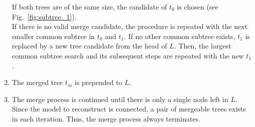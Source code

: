 \begin{enumerate}
	If both trees are of the same size, the candidate of $t_0$ is chosen (see Fig.~\ref{fig:subtree_1}).
	\\
	If there is no valid merge candidate, the procedure is repeated with the next smaller common subtree in $t_0$ and $t_1$.
	If no other common subtree exists, $t_1$ is replaced by a new tree candidate from the head of $L$.
	Then, the largest common subtree search and its subsequent steps are repeated with the new $t_1$.
	\item The merged tree $t_m$ is prepended to $L$.
	\item The merge process is continued until there is only a single node left in $L$.
	Since the model to reconstruct is connected, a pair of mergeable trees exists in each iteration. 
	Thus, the merge process always terminates.
\end{enumerate}

